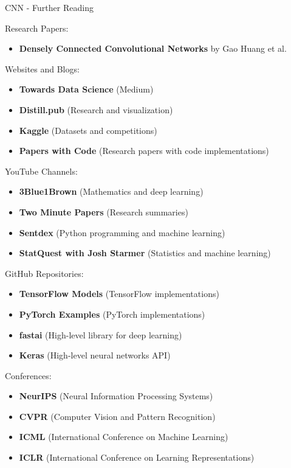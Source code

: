 \begin{frame}{CNN - Further Reading}
\begin{block}{Research Papers:}
\begin{itemize}
        \item \textbf{Densely Connected Convolutional Networks} by Gao Huang et al. \vspace{0.5em}
    \end{itemize}
\end{block}
\framebreak
\begin{block}{Websites and Blogs:}
    \begin{itemize}
        \item \textbf{Towards Data Science} (Medium)
        \item \textbf{Distill.pub} (Research and visualization)
        \item \textbf{Kaggle} (Datasets and competitions)
        \item \textbf{Papers with Code} (Research papers with code implementations)
    \end{itemize}
\end{block}
\framebreak
\begin{block}{YouTube Channels:}
    \begin{itemize}
        \item \textbf{3Blue1Brown} (Mathematics and deep learning)
        \item \textbf{Two Minute Papers} (Research summaries)
        \item \textbf{Sentdex} (Python programming and machine learning)
        \item \textbf{StatQuest with Josh Starmer} (Statistics and machine learning)
    \end{itemize}
\end{block}
\framebreak
\begin{block}{GitHub Repositories:}
    \begin{itemize}
        \item \textbf{TensorFlow Models} (TensorFlow implementations)
        \item \textbf{PyTorch Examples} (PyTorch implementations)
        \item \textbf{fastai} (High-level library for deep learning)
        \item \textbf{Keras} (High-level neural networks API)
    \end{itemize}
\end{block}
\framebreak
\begin{block}{Conferences:}
    \begin{itemize}
        \item \textbf{NeurIPS} (Neural Information Processing Systems)
        \item \textbf{CVPR} (Computer Vision and Pattern Recognition)
        \item \textbf{ICML} (International Conference on Machine Learning)
        \item \textbf{ICLR} (International Conference on Learning Representations)
    \end{itemize}
\end{block}
\end{frame}